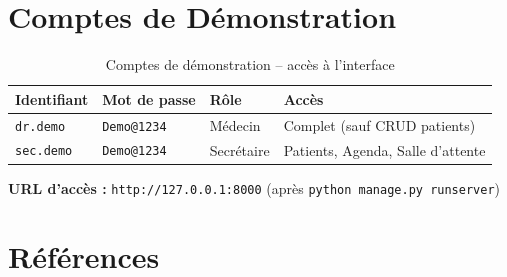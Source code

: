 \documentclass[12pt,a4paper]{report}
\begin{document}
\chapter{Comptes de Démonstration}

\begin{table}[H]
\centering
\caption{Comptes de démonstration -- accès à l'interface}
\renewcommand{\arraystretch}{1.6}
\begin{tabular}{|p{3.5cm}|p{3.5cm}|p{3.5cm}|p{3cm}|}
  \hline
  \rowcolor{medaccent}
  \textbf{Identifiant} & \textbf{Mot de passe} & \textbf{Rôle} & \textbf{Accès} \\
  \hline
  \texttt{dr.demo} & \texttt{Demo@1234} & Médecin & Complet (sauf CRUD patients) \\
  \hline
  \texttt{sec.demo} & \texttt{Demo@1234} & Secrétaire & Patients, Agenda, Salle d'attente \\
  \hline
\end{tabular}
\end{table}

\noindent\textbf{URL d'accès :} \texttt{http://127.0.0.1:8000} (après \texttt{python manage.py runserver})

\chapter{Références}
\end{document}
